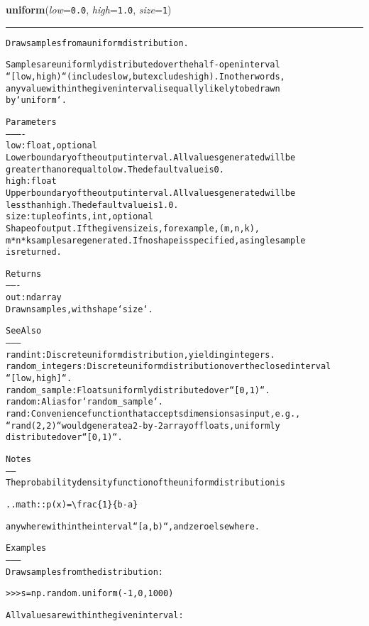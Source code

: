\hspace{.8\funcindent}\begin{boxedminipage}{\funcwidth}

    \raggedright \textbf{uniform}(\textit{low}={\tt 0.0}, \textit{high}={\tt 1.0}, \textit{size}={\tt 1})

    \vspace{-1.5ex}

    \rule{\textwidth}{0.5\fboxrule}
\setlength{\parskip}{2ex}
\begin{alltt}
Draw samples from a uniform distribution.

Samples are uniformly distributed over the half-open interval
``[low, high)`` (includes low, but excludes high).  In other words,
any value within the given interval is equally likely to be drawn
by `uniform`.

Parameters
----------
low : float, optional
    Lower boundary of the output interval.  All values generated will be
    greater than or equal to low.  The default value is 0.
high : float
    Upper boundary of the output interval.  All values generated will be
    less than high.  The default value is 1.0.
size : tuple of ints, int, optional
    Shape of output.  If the given size is, for example, (m,n,k),
    m*n*k samples are generated.  If no shape is specified, a single sample
    is returned.

Returns
-------
out : ndarray
    Drawn samples, with shape `size`.

See Also
--------
randint : Discrete uniform distribution, yielding integers.
random\_integers : Discrete uniform distribution over the closed interval
                  ``[low, high]``.
random\_sample : Floats uniformly distributed over ``[0, 1)``.
random : Alias for `random\_sample`.
rand : Convenience function that accepts dimensions as input, e.g.,
       ``rand(2,2)`` would generate a 2-by-2 array of floats, uniformly
       distributed over ``[0, 1)``.

Notes
-----
The probability density function of the uniform distribution is

.. math:: p(x) = {\textbackslash}frac\{1\}\{b - a\}

anywhere within the interval ``[a, b)``, and zero elsewhere.

Examples
--------
Draw samples from the distribution:

{\textgreater}{\textgreater}{\textgreater} s = np.random.uniform(-1,0,1000)

All values are within the given interval:


\end{alltt}
\end{boxedminipage}
